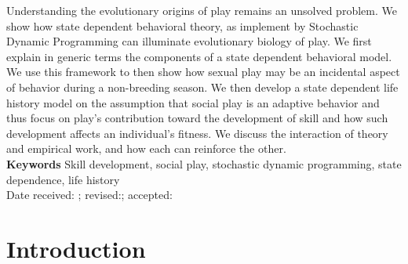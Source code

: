 \documentclass[12pt, letterpaper, fleqn]{article}
\begin{document}
%  
Understanding the evolutionary origins of play remains an unsolved problem.  
%
We show how state dependent behavioral theory, as implement by Stochastic Dynamic Programming can illuminate evolutionary biology of play.  
%
We first explain in generic terms the components of a state dependent behavioral model.  
%
We use this framework to then show how sexual play may be an incidental aspect of behavior during a non-breeding season.    
%
We then develop a  state dependent life history model on the assumption that social play is an adaptive behavior and thus focus on play's contribution toward the development of skill and how such development  affects an individual's fitness. 
%
We discuss the interaction of theory and empirical work, and how each can reinforce the other.\\
%
\newline
\textbf{Keywords}
Skill development, social play, stochastic dynamic programming, state dependence, life history\\
\newline
Date received:  ; revised:;  accepted: 

%
%
\newpage
\section*{Introduction}
\end{document}
